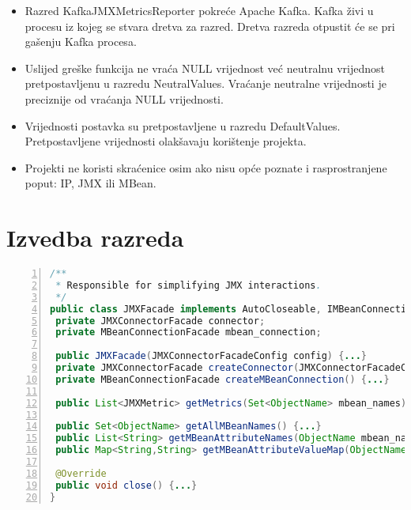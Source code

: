 \documentclass[utf8, diplomski, lmodern, numeric]{fer}
\begin{document}
\begin{itemize}
    \item Razred KafkaJMXMetricsReporter pokreće Apache Kafka. Kafka živi u procesu iz kojeg se stvara dretva za razred. Dretva razreda otpustit će se pri gašenju Kafka procesa.
    \item Uslijed greške funkcija ne vraća NULL vrijednost već neutralnu vrijednost pretpostavljenu u razredu NeutralValues. Vraćanje neutralne vrijednosti je preciznije od vraćanja NULL vrijednosti.
    \item Vrijednosti postavka su pretpostavljene u razredu DefaultValues. Pretpostavljene vrijednosti olakšavaju korištenje projekta.
    \item Projekti ne koristi skraćenice osim ako nisu opće poznate i rasprostranjene poput: IP, JMX ili MBean.
\end{itemize}


\section{Izvedba razreda}

\begin{lstlisting}[floatplacement=H, language=Java, caption={Izvadak iz projekta JMXMan}, captionpos=b, basicstyle=\footnotesize, numbers=left, stepnumber=1, backgroundcolor=\color{backcolour}, keywordstyle=\color{blue}, breaklines]
/**
 * Responsible for simplifying JMX interactions.
 */
public class JMXFacade implements AutoCloseable, IMBeanConnectionFacade {
 private JMXConnectorFacade connector;
 private MBeanConnectionFacade mbean_connection;

 public JMXFacade(JMXConnectorFacadeConfig config) {...}
 private JMXConnectorFacade createConnector(JMXConnectorFacadeConfig config) {...}
 private MBeanConnectionFacade createMBeanConnection() {...}
  
 public List<JMXMetric> getMetrics(Set<ObjectName> mbean_names) {...}
  
 public Set<ObjectName> getAllMBeanNames() {...}
 public List<String> getMBeanAttributeNames(ObjectName mbean_name) {...}
 public Map<String,String> getMBeanAttributeValueMap(ObjectName mbean_name, List<String> attributes) {...}
 
 @Override
 public void close() {...}
}
\end{lstlisting}
\end{document}
